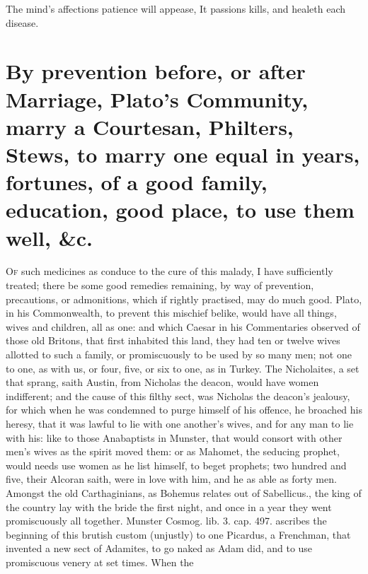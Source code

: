 {The mind's affections patience will appease,
It passions kills, and healeth each disease.


\section[By prevention before or after Marriage]{By prevention before, or after Marriage, Plato's Community, marry a Courtesan, Philters, Stews, to marry one equal in years, fortunes, of a good family, education, good place, to use them well, \&c.}

\lettrine{O}{f} such medicines as conduce to the cure of this malady, I have
sufficiently treated; there be some good remedies remaining, by way of
prevention, precautions, or admonitions, which if rightly practised,
may do much good. Plato, in his Commonwealth, to prevent this mischief
belike, would have all things, wives and children, all as one: and
which Caesar in his Commentaries observed of those old Britons, that
first inhabited this land, they had ten or twelve wives allotted to
such a family, or promiscuously to be used by so many men; not one to
one, as with us, or four, five, or six to one, as in Turkey. The
Nicholaites, a set that sprang, saith Austin, from Nicholas the
deacon, would have women indifferent; and the cause of this filthy
sect, was Nicholas the deacon's jealousy, for which when he was
condemned to purge himself of his offence, he broached his heresy, that
it was lawful to lie with one another's wives, and for any man to lie
with his: like to those Anabaptists in Munster, that would
consort with other men's wives as the spirit moved them: or as
Mahomet, the seducing prophet, would needs use women as he list
himself, to beget prophets; two hundred and five, their Alcoran saith,
were in love with him, and he as able as forty men. Amongst the
old Carthaginians, as Bohemus relates out of Sabellicus., the
king of the country lay with the bride the first night, and once in a
year they went promiscuously all together. Munster Cosmog. lib. 3. cap.
497. ascribes the beginning of this brutish custom (unjustly) to one
Picardus, a Frenchman, that invented a new sect of Adamites, to go
naked as Adam did, and to use promiscuous venery at set times. When the
}
